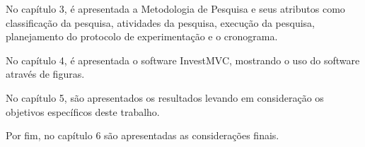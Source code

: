 No capítulo 3, é apresentada a Metodologia de Pesquisa e seus atributos como classificação da pesquisa, atividades da pesquisa, execução da pesquisa, planejamento do protocolo de experimentação e o cronograma.

No capítulo 4, é apresentada o software InvestMVC, mostrando o uso do software através de figuras.

No capítulo 5, são apresentados os resultados levando em consideração os objetivos específicos deste trabalho.

Por fim, no capítulo 6 são apresentadas as considerações finais.
